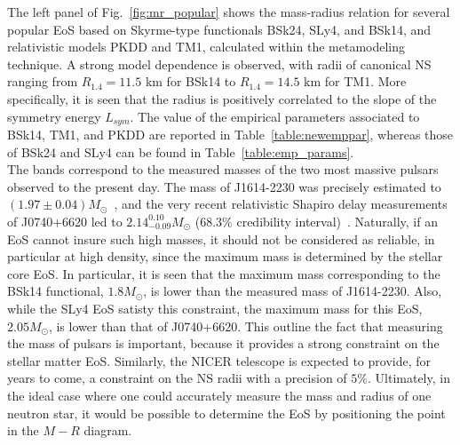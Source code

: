 The left panel of Fig.~\ref{fig:mr_popular} shows the mass-radius relation for 
several popular EoS based on Skyrme-type functionals BSk24, SLy4, and BSk14, 
and relativistic models PKDD and TM1, calculated within the metamodeling 
technique. A strong model dependence is observed, with radii of canonical NS 
ranging from $R_{1.4}=11.5$ km for BSk14 to $R_{1.4}=14.5$ km for TM1. More
specifically, it is seen that the radius is positively correlated to the slope 
of the symmetry energy $L_{sym}$. The value of the empirical parameters 
associated to BSk14, TM1, and PKDD are reported in Table~\ref{table:newemppar}, 
whereas those of BSk24 and SLy4 can be found in Table~\ref{table:emp_params}.\\
The bands correspond to the measured masses of the two most massive
pulsars observed to the present day. The mass of J1614-2230 was precisely 
estimated to $(1.97\pm 0.04)M_\odot$~\cite{Demorest2010}, and the very recent
relativistic Shapiro delay measurements of J0740+6620 led to 
$2.14_{-0.09}^{0.10}M_\odot$ ($68.3\%$ credibility
interval)~\cite{Cromartie2020}. Naturally, if an
EoS cannot insure such high masses, it should not be considered as reliable, 
in particular at high density, since the maximum mass is determined by the 
stellar core EoS. In particular, it is seen that the maximum mass corresponding
to the BSk14 functional, $1.8M_\odot$, is lower than the measured mass
of J1614-2230. Also, while the SLy4 EoS satisty this constraint, the maximum 
mass for this EoS, $2.05M_\odot$, is lower than that of J0740+6620. This 
outline the fact that measuring the mass of pulsars is important, because it 
provides a strong constraint on the stellar matter EoS. Similarly, the NICER
telescope is expected to provide, for years to come, a constraint on the NS
radii with a precision of $5\%$. Ultimately, in the ideal case where one could 
accurately measure the mass and radius of one neutron star, it would be 
possible to determine the EoS by positioning the point in the $M-R$ diagram.

